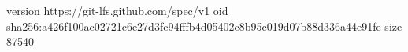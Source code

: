 version https://git-lfs.github.com/spec/v1
oid sha256:a426f100ac02721c6e27d3fc94fffb4d05402c8b95c019d07b88d336a44e91fe
size 87540
